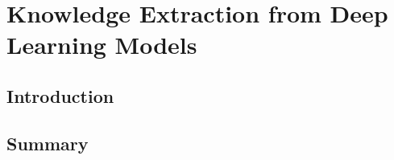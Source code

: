 \chapter{Knowledge Extraction from Deep Learning Models}
\label{chap:kbsextractiondl}

\section{Introduction}

\section{Summary}